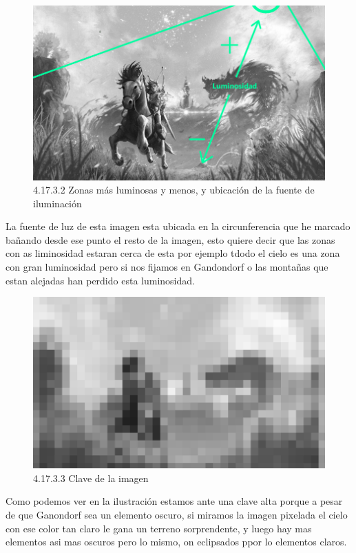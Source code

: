 \documentclass[12pt]{article}
\begin{document}
        \begin{figure}[H]
          \centering
          \includegraphics[width=\textwidth]{images/Saúl/Sección 17/EA_img17_3Claroscuro_2Luminosidad.png}
          \caption{\small 4.17.3.2 Zonas más luminosas y menos, y ubicación de la fuente de iluminación}
        \end{figure}
        La fuente de luz de esta imagen esta ubicada en la circunferencia que he marcado bañando desde ese punto el resto de la imagen, esto quiere decir que las zonas con as liminosidad estaran cerca de esta por ejemplo tdodo el cielo es una zona con gran luminosidad pero si nos fijamos en Gandondorf o las montañas que estan alejadas han perdido esta luminosidad.


        \begin{figure}[H]
          \centering
          \includegraphics[width=\textwidth]{images/Saúl/Sección 17/EA_img17_3Claroscuro_3Clave.png}
          \caption{\small 4.17.3.3 Clave de la imagen}
        \end{figure}
        Como podemos ver en la ilustración estamos ante una clave alta porque a pesar de que Ganondorf sea un elemento oscuro, si miramos la imagen pixelada el cielo con ese color tan claro le gana un terreno sorprendente, y luego hay mas elementos asi mas oscuros pero lo mismo, on eclipsados ppor lo elementos claros.
\end{document}
